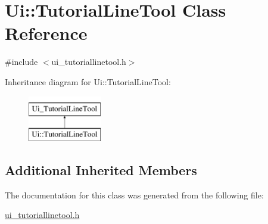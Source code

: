 \hypertarget{class_ui_1_1_tutorial_line_tool}{}\section{Ui\+:\+:Tutorial\+Line\+Tool Class Reference}
\label{class_ui_1_1_tutorial_line_tool}


{\ttfamily \#include $<$ui\+\_\+tutoriallinetool.\+h$>$}

Inheritance diagram for Ui\+:\+:Tutorial\+Line\+Tool\+:\begin{figure}[H]
\begin{center}
\leavevmode
\includegraphics[height=2.000000cm]{class_ui_1_1_tutorial_line_tool}
\end{center}
\end{figure}
\subsection*{Additional Inherited Members}


The documentation for this class was generated from the following file\+:\begin{DoxyCompactItemize}
\item 
\hyperlink{ui__tutoriallinetool_8h}{ui\+\_\+tutoriallinetool.\+h}\end{DoxyCompactItemize}

